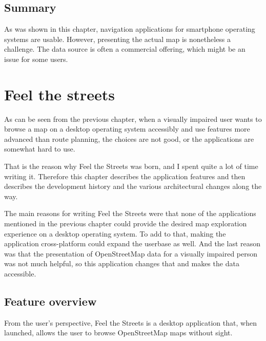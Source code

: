 \documentclass[nolof,digital]{fithesis3}
\begin{document}
\section{Summary}
As was shown in this chapter, navigation applications for smartphone operating systems are usable. However, presenting the actual map is nonetheless a challenge. The data source is often a commercial offering, which might be an issue for some users.
\chapter{Feel the streets} \label{ref:fts}
As can be seen from the previous chapter, when a visually impaired user wants to browse a map on a desktop operating system accessibly and use features more advanced than route planning, the choices are not good, or the applications are somewhat hard to use.

That is the reason why Feel the Streets was born, and I spent quite a lot of time writing it. Therefore this chapter describes the application features and then describes the development history and the various architectural changes along the way.

The main reasons for writing Feel the Streets were that none of the applications mentioned in the previous chapter could provide the desired map exploration experience on a desktop operating system. To add to that, making the application cross-platform could expand the userbase as well. And the last reason was that the presentation of OpenStreetMap data for a visually impaired person was not much helpful, so this application changes that and makes the data accessible.
\section{Feature overview}
From the user's perspective, Feel the Streets is a desktop application that, when launched, allows the user to browse OpenStreetMap maps without sight.
\end{document}
